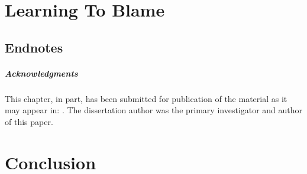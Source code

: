 \documentclass[11pt]{ucsddissertation}
\theoremstyle{plain}%
\theoremstyle{definition}
\begin{document}
%
%
%
%
%
%
%

\chapter{Learning To Blame}
\label{chp:nate}
\renewcommand\toolname{\tool{Nate}}
\renewcommand\lang{\ensuremath{\lambda^{ML}}}






%
\section*{Endnotes}
\paragraph{Acknowledgments}
  This chapter, in part, has been submitted for publication of
  the material as it may appear in:
  .
  The dissertation author was the primary investigator and author of
  this paper.

\chapter{Conclusion}


\appendix


\end{document}
